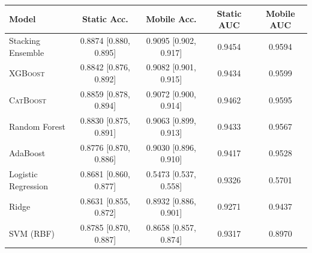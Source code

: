 \begin{tabular}{lcccc}
\toprule
Model & Static Acc. & Mobile Acc. & Static AUC & Mobile AUC \\
\midrule
Stacking Ensemble & 0.8874 [0.880, 0.895] & 0.9095 [0.902, 0.917] & 0.9454 & 0.9594 \\
\textsc{XGBoost} & 0.8842 [0.876, 0.892] & 0.9082 [0.901, 0.915] & 0.9434 & 0.9599 \\
\textsc{CatBoost} & 0.8859 [0.878, 0.894] & 0.9072 [0.900, 0.914] & 0.9462 & 0.9595 \\
Random Forest & 0.8830 [0.875, 0.891] & 0.9063 [0.899, 0.913] & 0.9433 & 0.9567 \\
AdaBoost & 0.8776 [0.870, 0.886] & 0.9030 [0.896, 0.910] & 0.9417 & 0.9528 \\
Logistic Regression & 0.8681 [0.860, 0.877] & 0.5473 [0.537, 0.558] & 0.9326 & 0.5701 \\
Ridge & 0.8631 [0.855, 0.872] & 0.8932 [0.886, 0.901] & 0.9271 & 0.9437 \\
SVM (RBF) & 0.8785 [0.870, 0.887] & 0.8658 [0.857, 0.874] & 0.9317 & 0.8970 \\
\bottomrule
\end{tabular}